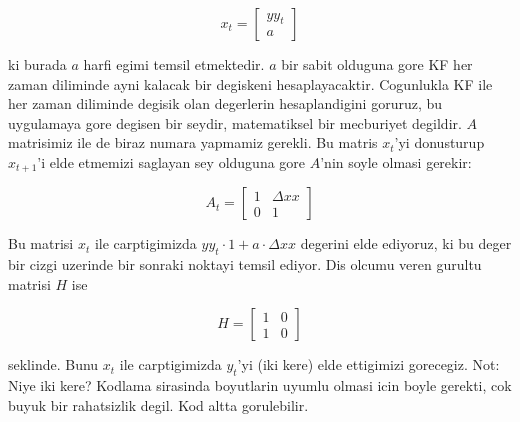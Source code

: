 \documentclass[12pt,fleqn]{article}\usepackage{../common}
\begin{document}
\[ x_t = 
\left[\begin{array}{r}
yy_t \\
a
\end{array}\right]
 \]

ki burada $a$ harfi egimi temsil etmektedir. $a$ bir sabit olduguna gore
KF her zaman diliminde ayni kalacak bir degiskeni
hesaplayacaktir. Cogunlukla KF ile her zaman diliminde degisik olan
degerlerin hesaplandigini goruruz, bu uygulamaya gore degisen bir seydir,
matematiksel bir mecburiyet degildir. $A$ matrisimiz ile de biraz numara
yapmamiz gerekli. Bu matris $x_t$'yi donusturup $x_{t+1}$'i elde etmemizi
saglayan sey olduguna gore $A$'nin soyle olmasi gerekir:

\[ 
A_t = 
\left[\begin{array}{rr}
1 & \Delta xx \\
0 & 1
\end{array}\right]
 \]

Bu matrisi $x_t$ ile carptigimizda $yy_t \cdot 1 + a \cdot \Delta xx$
degerini elde ediyoruz, ki bu deger bir cizgi uzerinde bir sonraki noktayi
temsil ediyor. Dis olcumu veren gurultu matrisi $H$ ise

\[ H =
\left[\begin{array}{rr}
1 & 0 \\
1 & 0
\end{array}\right]
 \]

seklinde. Bunu $x_t$ ile carptigimizda $y_t$'yi (iki kere) elde ettigimizi
gorecegiz.  Not: Niye iki kere? Kodlama sirasinda boyutlarin uyumlu olmasi
icin boyle gerekti, cok buyuk bir rahatsizlik degil. Kod altta
gorulebilir.
\end{document}
